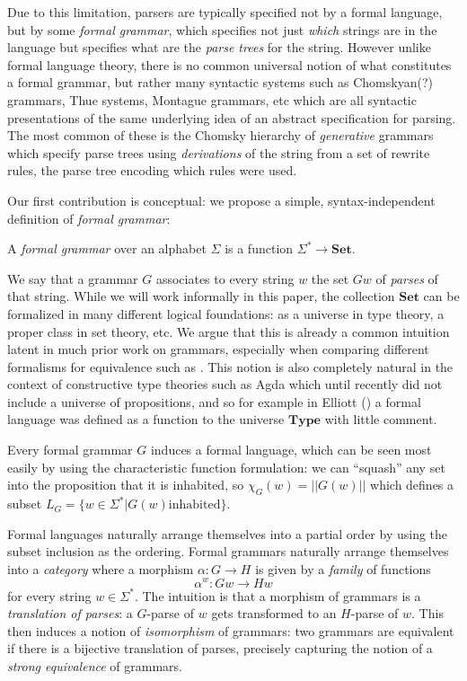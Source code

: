 \documentclass[sigconf,anonymous,review,screen]{acmart}
\newcommand{\Set}{\mathbf{Set}}
\newcommand{\Type}{\mathbf{Type}}
\begin{document}
Due to this limitation, parsers are typically specified not by a
formal language, but by some \emph{formal grammar}, which specifies
not just \emph{which} strings are in the language but specifies what
are the \emph{parse trees} for the string. However unlike formal
language theory, there is no common universal notion of what
constitutes a formal grammar, but rather many syntactic systems such
as Chomskyan(?)  grammars, Thue systems, Montague grammars, etc which
are all syntactic presentations of the same underlying idea of an
abstract specification for parsing. The most common of these is the
Chomsky hierarchy of \emph{generative} grammars which specify parse
trees using \emph{derivations} of the string from a set of rewrite
rules, the parse tree encoding which rules were used.

Our first contribution is conceptual: we propose a simple,
syntax-independent definition of \emph{formal grammar}:
\begin{definition}
  A \emph{formal grammar} over an alphabet $\Sigma$ is a function
  $\Sigma^* \to \Set$.
\end{definition}
We say that a grammar $G$ associates to every string $w$ the set $Gw$
of \emph{parses} of that string. While we will work informally in this
paper, the collection $\Set$ can be formalized in many different
logical foundations: as a universe in type theory, a proper class in
set theory, etc. We argue that this is already a common intuition
latent in much prior work on grammars, especially when comparing
different formalisms for equivalence such as \cite{??}. This notion is
also completely natural in the context of constructive type theories
such as Agda which until recently did not include a universe of
propositions, and so for example in Elliott (\cite{??}) a formal
language was defined as a function to the universe $\Type$ with little
comment.

Every formal grammar $G$ induces a formal language, which can be seen
most easily by using the characteristic function formulation: we can
``squash'' any set into the proposition that it is inhabited, so
$\chi_G(w) = ||G(w)||$ which defines a subset $L_G = \{ w \in
\Sigma^*| G(w) \mathrm{inhabited}\}$.

Formal languages naturally arrange themselves into a partial order by
using the subset inclusion as the ordering. Formal grammars naturally
arrange themselves into a \emph{category} where a morphism $\alpha : G
\to H$ is given by a \emph{family} of functions
\[ \alpha^w : Gw \to Hw \]
for every string $w \in \Sigma^*$. The intuition is that a morphism of
grammars is a \emph{translation of parses}: a $G$-parse of $w$ gets
transformed to an $H$-parse of $w$. This then induces a notion of
\emph{isomorphism} of grammars: two grammars are equivalent if there
is a bijective translation of parses, precisely capturing the notion
of a \emph{strong equivalence} of grammars.
\end{document}
